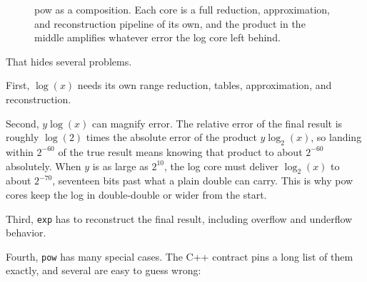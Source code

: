 \documentclass[manuscript, nonacm]{acmart}
\begin{document}
  \begin{figure}[tbp]
    \centering
    \caption{pow as a composition. Each core is a full reduction,
      approximation, and reconstruction pipeline of its own, and the product
      in the middle amplifies whatever error the log core left behind.}
    \label{fig:powcompose}
  \end{figure}

  That hides several problems.

  First, $\log(x)$ needs its own range reduction, tables, approximation, and
  reconstruction.

  Second, $y \log(x)$ can magnify error. The relative error of the final
  result is roughly $\log(2)$ times the absolute error of the product
  $y \log_2(x)$, so landing within $2^{-60}$ of the true result means
  knowing that product to about $2^{-60}$ absolutely. When $y$ is as
  large as $2^{10}$, the log core must deliver $\log_2(x)$ to about
  $2^{-70}$, seventeen bits past what a plain double can carry. This is
  why pow cores keep the log in double-double or wider from the start.

  Third, \texttt{exp} has to reconstruct the final result, including overflow
  and underflow behavior.

  Fourth, \texttt{pow} has many special cases. The C++ contract pins a
  long list of them exactly, and several are easy to guess wrong:
\end{document}
